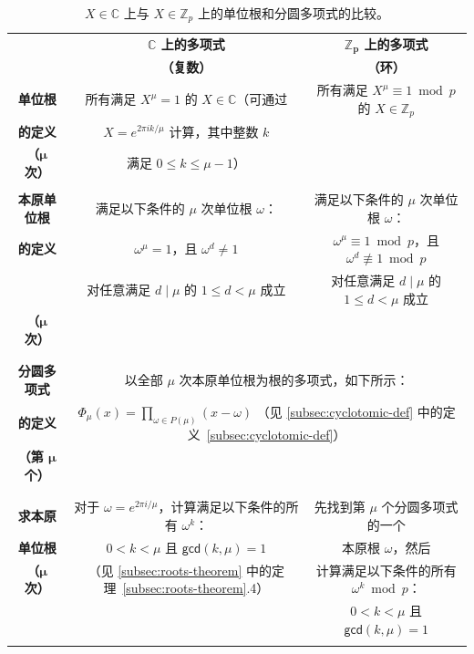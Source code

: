 \begin{table}[h] %
\begin{tabular}{|c||c||c|}
\hline \hline
& \textbf{$\bm{\mathbb{C}}$ 上的多项式} & \textbf{$\bm{\mathbb{Z}}_{\bm{p}}$ 上的多项式} \\
& \textbf{（复数）} & \textbf{（环）} \\ \hline \hline
\textbf{单位根}&所有满足 $X^\mu = 1$ 的 $X \in \mathbb{C}$（可通过&所有满足 $X^\mu \equiv 1 \bmod p$ 的 $X \in \mathbb{Z}_p$\\
\textbf{的定义}&$X = e^{2 \pi i k / \mu}$ 计算，其中整数 $k$&\\
\textbf{（$\bm \mu$ 次）}&满足 $0 \leq k \leq \mu - 1$）&\\
\textbf{}&&\\\hline
\textbf{本原单位根}&满足以下条件的 $\mu$ 次单位根 $\omega$：&满足以下条件的 $\mu$ 次单位根 $\omega$：\\
\textbf{的定义}&$\omega^{\mu} = 1$，且 $\omega^{d} \neq 1$&$\omega^{\mu} \equiv 1 \bmod p$，且 $\omega^{d} \not\equiv 1 \bmod p$\\
\textbf{}&对任意满足 $d \mid \mu$ 的 $1 \le d < \mu$ 成立&对任意满足 $d \mid \mu$ 的 $1 \le d < \mu$ 成立\\
\textbf{（$\bm \mu$ 次）}&&\\
\textbf{}&&\\
\textbf{}&&\\\hline
\textbf{分圆多项式}&\multicolumn{2}{|c|}{以全部 $\mu$ 次本原单位根为根的多项式，如下所示：}\\
\textbf{的定义}&\multicolumn{2}{|c|}{$ \Phi_{\mu}(x) = \prod_{\omega \in P(\mu)} (x - \omega) $ \text{ }（见 \autoref{subsec:cyclotomic-def} 中的定义~\ref*{subsec:cyclotomic-def}）}\\
\textbf{（第 $\bm \mu$ 个）}&\multicolumn{2}{|c|}{}\\
\textbf{}&\multicolumn{2}{|c|}{}\\
\textbf{}&\multicolumn{2}{|c|}{}\\\hline
\textbf{求本原}&对于 $\omega = e^{2 \pi i/ \mu}$，计算满足以下条件的所有 ${\omega}^k$：&先找到第 $\mu$ 个分圆多项式的一个\\
\textbf{单位根}&$0 < k < \mu $ 且 $\textsf{gcd}(k, \mu) = 1$&本原根 $\omega$，然后\\
\textbf{（$\bm \mu$ 次）}&（见 \autoref{subsec:roots-theorem} 中的定理~\ref*{subsec:roots-theorem}.4）&计算满足以下条件的所有 $\omega^k \bmod p$：\\
\textbf{}&&$0 < k < \mu $ 且 $\textsf{gcd}(k, \mu) = 1$\\
\textbf{}&&\\\hline\hline
\end{tabular}
\caption{$X \in \mathbb{C}$ 上与 $X \in \mathbb{Z}_p$ 上的单位根和分圆多项式的比较。}
\label{tab:cyclotomic-polynomial-comparison}
\end{table}


